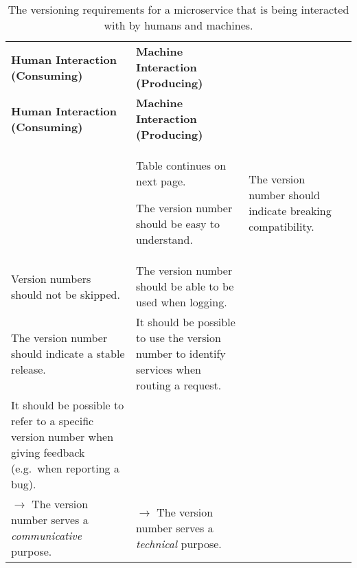\begin{longtable}{XXXX}%
\label{tab:versioning_machine_human}
\vspace{0.25cm}\\
\toprule
\textbf{Human Interaction (Consuming)} & \textbf{Machine Interaction (Producing)} \\ 
\midrule
\endfirsthead
\toprule
\textbf{Human Interaction (Consuming)} & \textbf{Machine Interaction (Producing)} \\ 
\midrule
\endhead
\midrule
& \hspace*{\fill} \small{Table continues on next page.}
\endfoot
\bottomrule
\caption{The versioning requirements for a microservice that is being interacted with by humans and machines.}
\endlastfoot
The version number should be easy to understand. & The version number should indicate breaking compatibility.\\
Version numbers should not be skipped. & The version number should be able to be used when logging.\\
The version number should indicate a stable release. & It should be possible to use the version number to identify services when routing a request.\\
It should be possible to refer to a specific version number when giving feedback (e.g.\ when reporting a bug). &\\
$\to$ The version number serves a \textit{communicative} purpose. & $\to$ The version number serves a \textit{technical} purpose.
\end{longtable}
